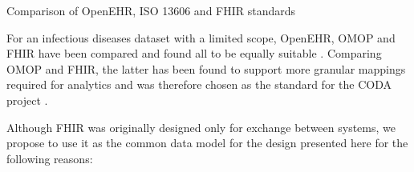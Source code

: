 \documentclass[
  authoryear]{elsarticle}
\begin{document}
\begin{table}

\caption{\label{tbl-comparison}Comparison of OpenEHR, ISO 13606 and FHIR
standards}


\end{table}%

For an infectious diseases dataset with a limited scope, OpenEHR, OMOP
and FHIR have been compared and found all to be equally suitable
\citep{rinaldi2021openehr}. Comparing OMOP and FHIR, the latter has been
found to support more granular mappings required for analytics and was
therefore chosen as the standard for the CODA project
\citep{mullie2023coda}.

Although FHIR was originally designed only for exchange between systems,
we propose to use it as the common data model for the design presented
here for the following reasons:
\end{document}
